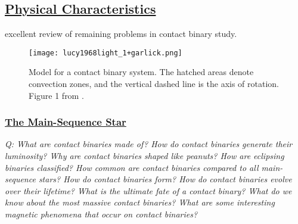 \documentclass[12pt]{article} %
\numberwithin{equation}{section} %
\begin{document}






\subsection[Physical Characteristics]{\hyperlink{toc}{Physical Characteristics}}

\citep[p.76, ][]{webbink2003contact} excellent review of remaining problems in contact binary study. 

\begin{figure}[H]
\centering
\texttt{[image: lucy1968light\_1+garlick.png]}
\caption{Model for a contact binary system. The hatched areas denote convection zones, and the vertical dashed line is the axis of rotation. Figure 1 from \citet{lucy1968light}.}
\label{fig: lucy1968light_1}
\end{figure}

\subsubsection[The Main-Sequence Star]{\hyperlink{toc}{The Main-Sequence Star}} \label{sec: The Main-Sequence Star}

\emph{Q: What are contact binaries made of? How do contact binaries generate their luminosity? Why are contact binaries shaped like peanuts? How are eclipsing binaries classified? How common are contact binaries compared to all main-sequence stars? How do contact binaries form? How do contact binaries evolve over their lifetime? What is the ultimate fate of a contact binary? What do we know about the most massive contact binaries? What are some interesting magnetic phenomena that occur on contact binaries?  }
\end{document}
